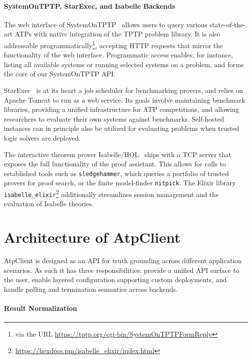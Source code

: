 \documentclass[]{ceurart}
\begin{document}
\paragraph{SystemOnTPTP, StarExec, and Isabelle Backends}

The web interface of SystemOnTPTP~\cite{sutcliffe2000sotptp} allows users to query various state-of-the-art ATPs with native integration of the TPTP problem library. It is also addressable programmatically\footnote{via the URL \url{https://tptp.org/cgi-bin/SystemOnTPTPFormReply}}, accepting HTTP requests that mirror the functionality of the web interface. Programmatic access enables, for instance, listing all available systems or running selected systems on a problem, and forms the core of our SystemOnTPTP API.

StarExec~\cite{stump2017starexec} is at its heart a job scheduler for benchmarking provers, and relies on Apache Tomcat to run as a web service. Its goals involve maintaining benchmark libraries, providing a unified infrastructure for ATP competitions, and allowing researchers to evaluate their own systems against benchmarks. Self-hosted instances can in principle also be utilized for evaluating problems when trusted logic solvers are deployed.

The interactive theorem prover Isabelle/HOL~\cite{nipkow2002isabelle} ships with a TCP server that exposes the full functionality of the proof assistant. This allows for calls to established tools such as \texttt{sledgehammer}, which queries a portfolio of trusted provers for proof search, or the finite model-finder \texttt{nitpick}. The Elixir library \texttt{isabelle\_elixir}\footnote{\url{https://hexdocs.pm/isabelle_elixir/index.html}} additionally streamlines session management and the evaluation of Isabelle theories.

\section{Architecture of AtpClient}\label{sec:3}

AtpClient is designed as an API for truth grounding across different application scenarios. As such it has three responsibilities: provide a unified API surface to the user, enable layered configuration supporting custom deployments, and handle polling and termination semantics across backends.

\paragraph{Result Normalization}
\end{document}
